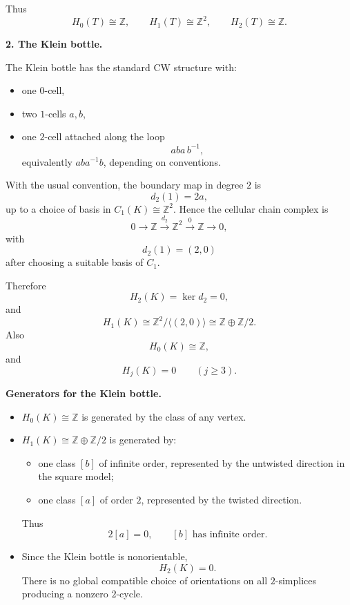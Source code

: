\begin{solution}
Thus
\[
H_0(T)\cong \mathbb Z,\qquad
H_1(T)\cong \mathbb Z^2,\qquad
H_2(T)\cong \mathbb Z.
\]

\par

\textbf{2. The Klein bottle.}

The Klein bottle has the standard CW structure with:

\begin{itemize}
	\item one \(0\)-cell,
	\item two \(1\)-cells \(a,b\),
	\item one \(2\)-cell attached along the loop
	\[
	aba\,b^{-1},
	\]
	equivalently \(aba^{-1}b\), depending on conventions.
\end{itemize}

With the usual convention, the boundary map in degree \(2\) is
\[
d_2(1)=2a,
\]
up to a choice of basis in \(C_1(K)\cong \mathbb Z^2\). Hence the cellular chain complex is
\[
0 \longrightarrow \mathbb Z
\xrightarrow{d_2}
\mathbb Z^2
\xrightarrow{0}
\mathbb Z
\longrightarrow 0,
\]
with
\[
d_2(1)=(2,0)
\]
after choosing a suitable basis of \(C_1\).

Therefore
\[
H_2(K)=\ker d_2=0,
\]
and
\[
H_1(K)\cong \mathbb Z^2/\langle (2,0)\rangle \cong \mathbb Z\oplus \mathbb Z/2.
\]
Also
\[
H_0(K)\cong \mathbb Z,
\]
and
\[
H_j(K)=0 \qquad (j\ge 3).
\]

\par

\textbf{Generators for the Klein bottle.}

\begin{itemize}
	\item \(H_0(K)\cong \mathbb Z\) is generated by the class of any vertex.
	\item \(H_1(K)\cong \mathbb Z\oplus \mathbb Z/2\) is generated by:
	\begin{itemize}
		\item one class \([b]\) of infinite order, represented by the untwisted direction in the square model;
		\item one class \([a]\) of order \(2\), represented by the twisted direction.
	\end{itemize}
	Thus
	\[
	2[a]=0,
	\qquad
	[b]\text{ has infinite order}.
	\]
	\item Since the Klein bottle is nonorientable,
	\[
	H_2(K)=0.
	\]
	There is no global compatible choice of orientations on all \(2\)-simplices producing a nonzero \(2\)-cycle.
\end{itemize}


\end{solution}
